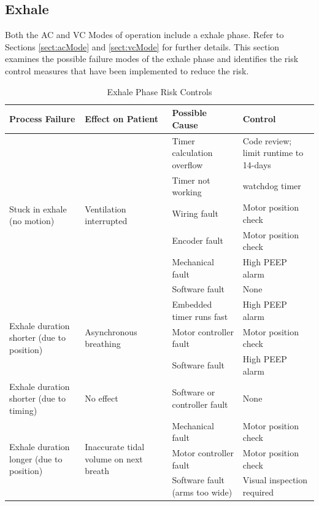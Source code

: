 \documentclass[]{article}
\begin{document}
\subsection{Exhale}
Both the AC and VC Modes of operation include a exhale phase.  Refer to Sections \ref{sect:acMode} and \ref{sect:vcMode} for further details.  This section examines the possible failure modes of the exhale phase and identifies the risk control measures that have been implemented to reduce the risk.

\begin{center}
	\begin{table}[h]
		\caption{Exhale Phase Risk Controls}
		\label{tab:exhale_risk}
		\begin{tabular}{ |p{3.5cm}|p{3cm}| p{3.5cm}| p{3.5cm}|}
			
			
			\hline
			\textbf{Process Failure}& \textbf{Effect on Patient} &\textbf{Possible Cause} & \textbf{Control}  \\ \hline
			\multirow{6}{3.5cm}{Stuck in exhale (no motion)} & \multirow{6}{3cm}{Ventilation interrupted} & Timer calculation overflow & Code review; limit runtime to 14-days \\ \cline{3-4}
			& & Timer not working & watchdog timer\\ \cline{3-4}
			& & Wiring fault & Motor position check\\ \cline{3-4}
			& & Encoder fault & Motor position check\\ \cline{3-4}
			& & Mechanical fault & High PEEP alarm\\ \hline
			& & Software fault & None\\ \hline
			\multirow{3}{3.5cm}{Exhale duration shorter (due to position)} & \multirow{3}{3cm}{Asynchronous breathing} & Embedded timer runs fast & High PEEP alarm\\ \cline{3-4}
			& & Motor controller fault & Motor position check\\ \cline{3-4}
			& & Software fault & High PEEP alarm\\ \hline
			Exhale duration shorter (due to timing) & No effect & Software or controller fault & None\\ \hline
			\multirow{3}{3.5cm}{Exhale duration longer (due to position)} & \multirow{3}{3cm}{Inaccurate tidal volume on next breath} & Mechanical fault & Motor position check \\ \cline{3-4}
			& & Motor controller fault & Motor position check\\ \cline{3-4}
			& & Software fault (arms too wide) & Visual inspection required\\ \hline

\end{tabular}
\end{table}
\end{center}
\end{document}
